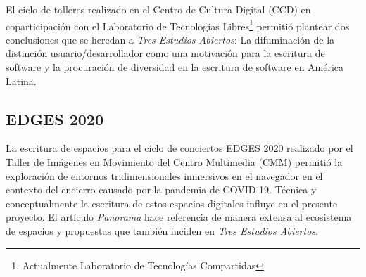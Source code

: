 El ciclo de talleres realizado en el Centro de Cultura Digital (CCD) en coparticipación con el Laboratorio de Tecnologías Libres\footnote{Actualmente Laboratorio de Tecnologías Compartidas} permitió plantear dos conclusiones que se heredan a \textit{Tres Estudios Abiertos}: La difuminación de la distinción usuario/desarrollador como una motivación para la escritura de software y la procuración de diversidad en la escritura de software en América Latina.

\subsection{EDGES 2020}

La escritura de espacios para el ciclo de conciertos EDGES 2020 realizado por el Taller de Imágenes en Movimiento del Centro Multimedia (CMM) permitió la exploración de entornos tridimensionales inmersivos en el navegador en el contexto del encierro causado por la pandemia de COVID-19. Técnica y conceptualmente la escritura de estos espacios digitales influye en el presente proyecto. El artículo \textit{Panorama} \citep{panoramaArticulo} hace referencia de manera extensa al ecosistema de espacios y propuestas que también inciden en \textit{Tres Estudios Abiertos}.

